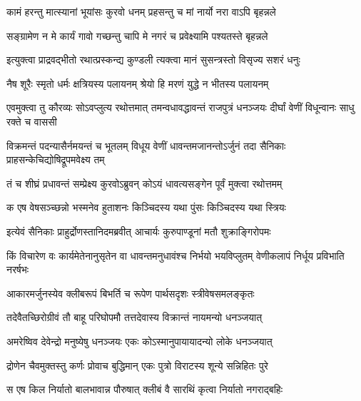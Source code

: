 


\twolineshloka
{कामं हरन्तु मात्स्यानां भूयांसः कुरवो धनम्}
{प्रहसन्तु च मां नार्यो नरा वाऽपि बृहन्नले}


\twolineshloka
{सङ्ग्रामेण न मे कार्यं गावो गच्छन्तु चापि मे}
{नगरं च प्रवेक्ष्यामि पश्यतस्ते बृहन्नले}



\twolineshloka
{इत्युक्त्वा प्राद्रवद्भीतो रथात्प्रस्कन्द्य कुण्डली}
{त्यक्त्वा मानं सुसन्त्रस्तो विसृज्य सशरं धनुः}




\twolineshloka
{नैष शूरैः स्मृतो धर्मः क्षत्रियस्य पलायनम्}
{श्रेयो हि मरणं युद्धे न भीतस्य पलायनम्}



\threelineshloka
{एवमुक्त्वा तु कौरव्यः सोऽवप्लुत्य रथोत्तमात्}
{तमन्वधावद्धावन्तं राजपुत्रं धनञ्जयः}
{दीर्घां वेणीं विधून्वानः साधु रक्ते च वाससी}


\threelineshloka
{विक्रमन्तं पदन्यासैर्नमयन्तं च भूतलम्}
{विधूय वेणीं धावन्तमजानन्तोऽर्जुनं तदा}
{सैनिकाः प्राहसन्केचिद्योषिद्रूपमवेक्ष्य तम्}


\twolineshloka
{तं च शीघ्रं प्रधावन्तं सम्प्रेक्ष्य कुरवोऽब्रुवन्}
{कोऽयं धावत्यसङ्गेन पूर्वं मुक्त्वा रथोत्तमम्}


\twolineshloka
{क एष वेषसञ्च्छन्नो भस्मनेव हुताशनः}
{किञ्चिदस्य यथा पुंसः किञ्चिदस्य यथा स्त्रियः}


\twolineshloka
{इत्येवं सैनिकाः प्राहुर्द्रोणस्तानिदमब्रवीत्}
{आचार्यः कुरुपाण्डूनां मतौ शुक्राङ्गिरोपमः}


\threelineshloka
{किं विचारेण वः कार्यमेतेनानुसृतेन वा}
{धावन्तमनुधावंश्च निर्भयो भयविप्लुतम्}
{वेणीकलापं निर्धूय प्रविभाति नरर्षभः}


\twolineshloka
{आकारमर्जुनस्येव क्लीबरूपं बिभर्ति च}
{रूपेण पार्थसदृशः स्त्रीवेषसमलङ्कृतः}


\twolineshloka
{तदेवैतच्छिरोग्रीवं तौ बाहू परिघोपमौ}
{तत्तदेवास्य विक्रान्तं नायमन्यो धनञ्जयात्}


\twolineshloka
{अमरेष्विव देवेन्द्रो मनुष्येषु धनञ्जयः}
{एकः कोऽस्मानुपायायादन्यो लोके धनञ्जयात्}


\twolineshloka
{द्रोणेन चैवमुक्तस्तु कर्णः प्रोवाच बुद्धिमान्}
{एकः पुत्रो विराटस्य शून्ये सन्निहितः पुरे}


\twolineshloka
{स एष किल निर्यातो बालभावान्न पौरुषात्}
{क्लीबं वै सारथिं कृत्वा निर्यातो नगराद्बहिः}


